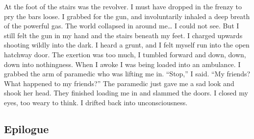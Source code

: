 \documentclass[a4paper]{article}
\begin{document}
At the foot of the stairs was the revolver. I must have dropped in the frenzy to pry the bars loose. I grabbed for the gun, and involuntarily inhaled a deep breath of the powerful gas.
The world collapsed in around me… I could not see.
But I still felt the gun in my hand and the stairs beneath my feet. I charged upwards shooting wildly into the dark. I heard a grunt, and I felt myself run into the open hatchway door. The exertion was too much, I tumbled forward and down, down, down into nothingness.
When I awoke I was being loaded into an ambulance. I grabbed the arm of paramedic who was lifting me in. “Stop,” I said. “My friends? What happened to my friends?”
The paramedic just gave me a sad look and shook her head. They finished loading me in and slammed the doors. I closed my eyes, too weary to think. I drifted back into unconsciousness.

\subsection{Epilogue}
\end{document}

